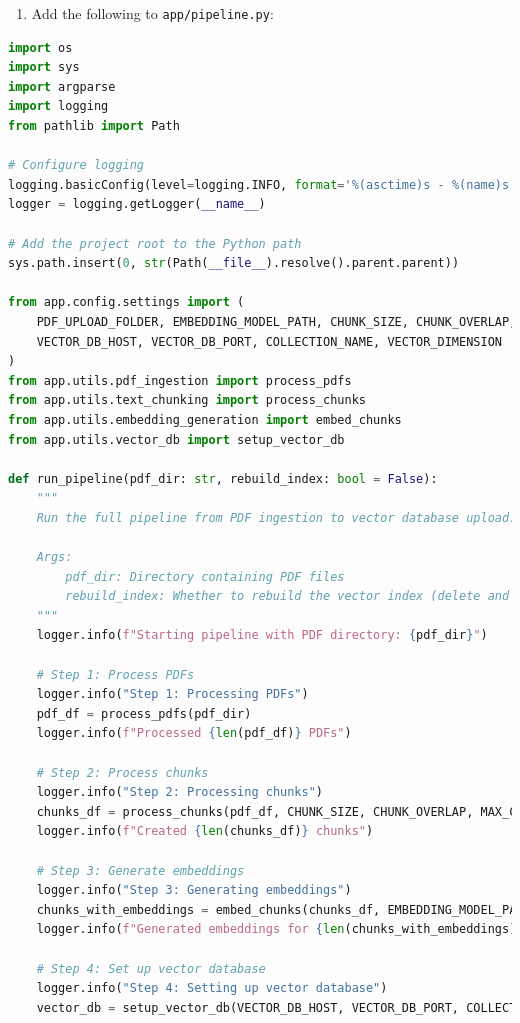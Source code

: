 \documentclass[
  screen,review,acmlarge]{acmart}
\newcommand{\passthrough}[1]{#1}
\providecommand{\tightlist}{%
  \setlength{\itemsep}{0pt}\setlength{\parskip}{0pt}}
\begin{document}
\begin{enumerate}
\def\labelenumi{\arabic{enumi}.}
\setcounter{enumi}{5}
\tightlist
\item
  Add the following to \passthrough{\lstinline!app/pipeline.py!}:
\end{enumerate}

\begin{lstlisting}[language=Python]
import os
import sys
import argparse
import logging
from pathlib import Path

# Configure logging
logging.basicConfig(level=logging.INFO, format='%(asctime)s - %(name)s - %(levelname)s - %(message)s')
logger = logging.getLogger(__name__)

# Add the project root to the Python path
sys.path.insert(0, str(Path(__file__).resolve().parent.parent))

from app.config.settings import (
    PDF_UPLOAD_FOLDER, EMBEDDING_MODEL_PATH, CHUNK_SIZE, CHUNK_OVERLAP, MAX_CHUNKS_PER_DOC,
    VECTOR_DB_HOST, VECTOR_DB_PORT, COLLECTION_NAME, VECTOR_DIMENSION
)
from app.utils.pdf_ingestion import process_pdfs
from app.utils.text_chunking import process_chunks
from app.utils.embedding_generation import embed_chunks
from app.utils.vector_db import setup_vector_db

def run_pipeline(pdf_dir: str, rebuild_index: bool = False):
    """
    Run the full pipeline from PDF ingestion to vector database upload.
    
    Args:
        pdf_dir: Directory containing PDF files
        rebuild_index: Whether to rebuild the vector index (delete and recreate)
    """
    logger.info(f"Starting pipeline with PDF directory: {pdf_dir}")
    
    # Step 1: Process PDFs
    logger.info("Step 1: Processing PDFs")
    pdf_df = process_pdfs(pdf_dir)
    logger.info(f"Processed {len(pdf_df)} PDFs")
    
    # Step 2: Process chunks
    logger.info("Step 2: Processing chunks")
    chunks_df = process_chunks(pdf_df, CHUNK_SIZE, CHUNK_OVERLAP, MAX_CHUNKS_PER_DOC)
    logger.info(f"Created {len(chunks_df)} chunks")
    
    # Step 3: Generate embeddings
    logger.info("Step 3: Generating embeddings")
    chunks_with_embeddings = embed_chunks(chunks_df, EMBEDDING_MODEL_PATH)
    logger.info(f"Generated embeddings for {len(chunks_with_embeddings)} chunks")
    
    # Step 4: Set up vector database
    logger.info("Step 4: Setting up vector database")
    vector_db = setup_vector_db(VECTOR_DB_HOST, VECTOR_DB_PORT, COLLECTION_NAME, VECTOR_DIMENSION)
    

\end{lstlisting}
\end{document}
